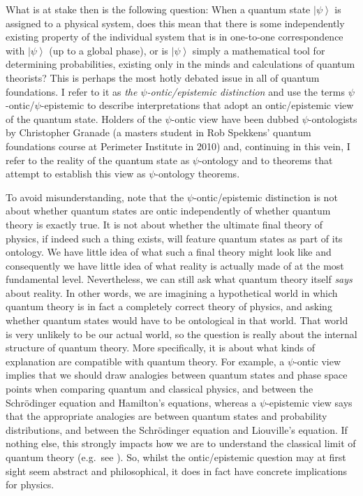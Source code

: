 \documentclass[DIV=calc,fontsize=12pt]{scrartcl} %
\theoremstyle{definition}
\theoremstyle{plain}
\newcommand{\Ket}[1]{\ensuremath{\left \vert #1 \right \rangle}}
\begin{document}
What is at stake then is the following question: When a quantum state
$\Ket{\psi}$ is assigned to a physical system, does this mean that
there is some independently existing property of the individual system
that is in one-to-one correspondence with $\Ket{\psi}$ (up to a global
phase), or is $\Ket{\psi}$ simply a mathematical tool for determining
probabilities, existing only in the minds and calculations of quantum
theorists?  This is perhaps the most hotly debated issue in all of
quantum foundations.  I refer to it as \emph{the
$\psi$-ontic/epistemic distinction} and use the terms
$\psi$-ontic/$\psi$-epistemic to describe interpretations that adopt
an ontic/epistemic view of the quantum state.  Holders of the
$\psi$-ontic view have been dubbed $\psi$-ontologists by Christopher
Granade (a masters student in Rob Spekkens' quantum foundations course
at Perimeter Institute in 2010) and, continuing in this vein, I refer
to the reality of the quantum state as $\psi$-ontology and to theorems
that attempt to establish this view as $\psi$-ontology theorems.

To avoid misunderstanding, note that the $\psi$-ontic/epistemic
distinction is not about whether quantum states are ontic
independently of whether quantum theory is exactly true.  It is not
about whether the ultimate final theory of physics, if indeed such a
thing exists, will feature quantum states as part of its ontology.  We
have little idea of what such a final theory might look like and
consequently we have little idea of what reality is actually made of
at the most fundamental level.  Nevertheless, we can still ask what
quantum theory itself \emph{says} about reality.  In other words, we
are imagining a hypothetical world in which quantum theory is in fact
a completely correct theory of physics, and asking whether quantum
states would have to be ontological in that world.  That world is very
unlikely to be our actual world, so the question is really about the
internal structure of quantum theory.  More specifically, it is about
what kinds of explanation are compatible with quantum theory.  For
example, a $\psi$-ontic view implies that we should draw analogies
between quantum states and phase space points when comparing quantum
and classical physics, and between the Schr{\"o}dinger equation and
Hamilton's equations, whereas a $\psi$-epistemic view says that the
appropriate analogies are between quantum states and probability
distributions, and between the Schr{\"o}dinger equation and
Liouville's equation.  If nothing else, this strongly impacts how we
are to understand the classical limit of quantum theory (e.g.\ see
\cite{Ballentine1994, Emerson2001, Emerson2001a, Emerson2001b}).  So,
whilst the ontic/epistemic question may at first sight seem abstract
and philosophical, it does in fact have concrete implications for
physics.
\end{document}
